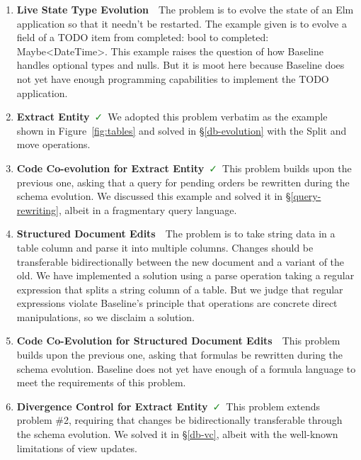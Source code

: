 \documentclass[english,submission]{programming}
\theoremstyle{definition}
\newcommand{\redCross}{\textcolor{red}{\ \faTimes\ }}
\newcommand{\greenCheck}{\textcolor{ForestGreen}{\ \faCheck\ }}
\begin{document}
\begin{enumerate}

  \item \textbf{Live State Type Evolution}\redCross The problem is to evolve the state of an Elm application so that it needn't be restarted.
  The example given is to evolve a field of a TODO item from \textsf{completed: bool} to \textsf{completed: Maybe<DateTime>}. This example raises the question of how Baseline handles optional types and nulls. But it is moot here because Baseline does not yet have enough programming capabilities to implement the TODO application.

  \item \textbf{Extract Entity}\greenCheck We adopted this problem verbatim as the example shown in Figure~\ref{fig:tables} and solved in \S\ref{db-evolution} with the \textsf{Split} and \textsf{move} operations.

  \item \textbf{Code Co-evolution for Extract Entity}\greenCheck This problem builds upon the previous one, asking that a query for pending orders be rewritten during the schema evolution. We discussed this example and solved it in \S\ref{query-rewriting}, albeit in a fragmentary query language.

  \item \textbf{Structured Document Edits}\redCross The problem is to take string data in a table column and parse it into multiple columns. Changes should be transferable bidirectionally between the new document and a variant of the old. We have implemented a solution using a \textsf{parse} operation taking a regular expression that splits a string column of a table. But we judge that regular expressions violate Baseline's principle that operations are concrete direct manipulations, so we disclaim a solution.

  \item \textbf{Code Co-Evolution for Structured Document Edits}\redCross This problem builds upon the previous one, asking that formulas be rewritten during the schema evolution. Baseline does not yet have enough of a formula language to meet the requirements of this problem.

  \item \textbf{Divergence Control for Extract Entity}\greenCheck This problem extends problem \#2, requiring that changes be bidirectionally transferable through the schema evolution. We solved it in \S\ref{db-vc}, albeit with the well-known limitations of view updates.


\end{enumerate}
\end{document}
